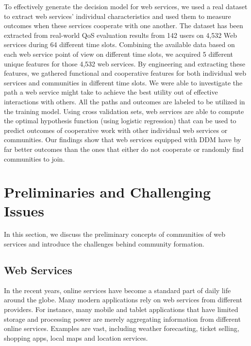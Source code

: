 To effectively generate the decision model for web services, we used a real dataset to extract web services' individual characteristics and used them to measure outcomes when these services cooperate with one another. The dataset has been extracted from real-world QoS evaluation results from 142 users on 4,532 Web services during 64 different time slots. Combining the available data based on each web service point of view on different time slots, we acquired 5 different unique features for those 4,532 web services. By engineering and extracting these features, we gathered functional and cooperative features for both individual web services and communities in different time slots. We were able to investigate the path a web service might take to achieve the best utility out of effective interactions with others. All the paths and outcomes are labeled to be utilized in the training model. Using cross validation sets, web services are able to compute the optimal hypothesis function (using logistic regression) that can be used to predict outcomes of cooperative work with other individual web services or communities. Our findings show that web services equipped with DDM have by far better outcomes than the ones that either do not cooperate or randomly find communities to join.

\section{Preliminaries and Challenging Issues}\label{s4:preliminaries}
In this section, we discuss the preliminary concepts of communities of web services and introduce the challenges behind community formation.

\subsection{Web Services}\label{s:ws}

In the recent years, online services have become a standard part of daily life around the globe. Many modern applications rely on web services from different providers. For instance, many mobile and tablet applications that have limited storage and processing power are merely aggregating information from different online services. Examples are vast, including weather forecasting, ticket selling, shopping apps, local maps and location services.

